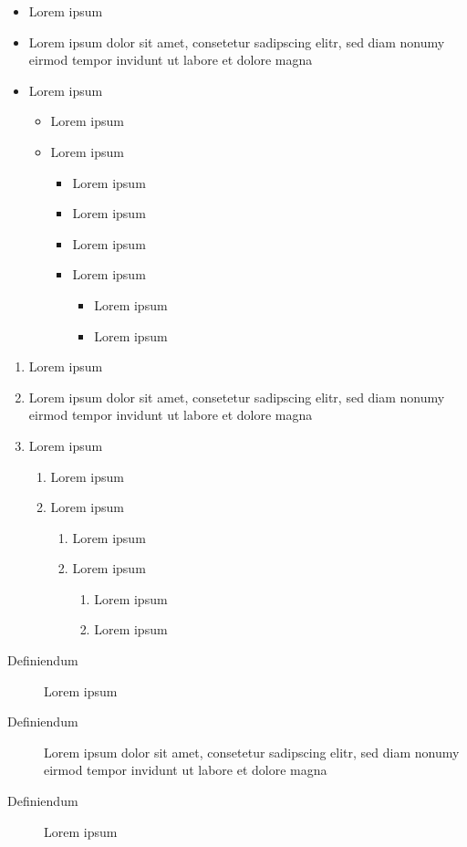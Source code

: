\documentclass[
 UKenglish%
 ]{report}
\begin{document}
\newpage
\begin{itemize}
\item Lorem ipsum
\item Lorem ipsum dolor sit amet, consetetur sadipscing elitr, sed diam nonumy eirmod tempor invidunt ut labore et dolore magna 
\item Lorem ipsum
  \begin{itemize}
  \item Lorem ipsum
  \item Lorem ipsum
    \begin{itemize}
    \item Lorem ipsum
    \item Lorem ipsum
    \end{itemize}
    \begin{itemize}
    \item Lorem ipsum
    \item Lorem ipsum
      \begin{itemize}
      \item Lorem ipsum
      \item Lorem ipsum
      \end{itemize}
    \end{itemize}
  \end{itemize}
\end{itemize}

\begin{enumerate}
\item Lorem ipsum
\item Lorem ipsum dolor sit amet, consetetur sadipscing elitr, sed diam nonumy eirmod tempor invidunt ut labore et dolore magna 
\item Lorem ipsum
  \begin{enumerate}
  \item Lorem ipsum
  \item Lorem ipsum
    \begin{enumerate}
    \item Lorem ipsum
    \item Lorem ipsum
      \begin{enumerate}
      \item Lorem ipsum
      \item Lorem ipsum
      \end{enumerate}
    \end{enumerate}
  \end{enumerate}
\end{enumerate}

\begin{description}
\item[Definiendum] Lorem ipsum
\item[Definiendum] Lorem ipsum dolor sit amet, consetetur sadipscing elitr, sed diam nonumy eirmod tempor invidunt ut labore et dolore magna 
\item[Definiendum] Lorem ipsum
\end{description}
\end{document}
